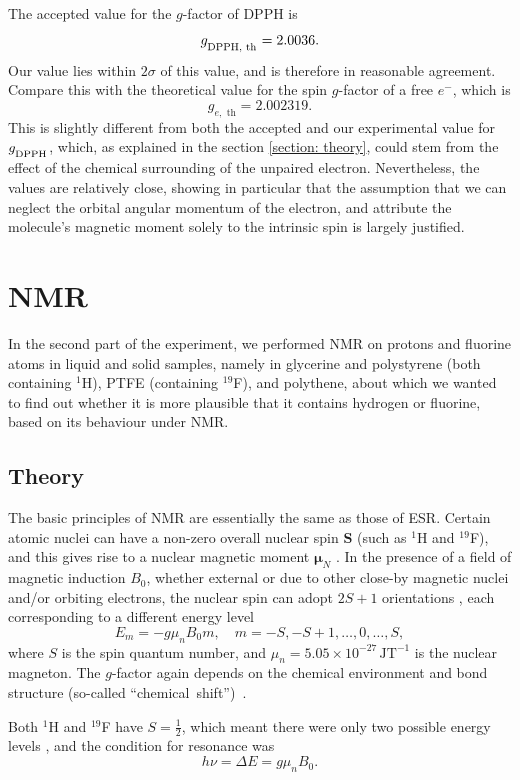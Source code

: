 \documentclass[a4paper]{jpconf}
\numberwithin{equation}{section}
\begin{document}
The accepted value for the $g$-factor of DPPH is
\[
	g_{\textsubscript{DPPH, th}} = 2.0036.
\]
Our value lies within $2\sigma$ of this value, and is therefore in reasonable agreement.
Compare this with the theoretical value for the spin $g$-factor of a free $e^-$, which is
\[
	g_{e,\text{ th}} = 2.002319.
\]
This is slightly different from both the accepted and our experimental value for $g_{\textsubscript{DPPH}}$, which, as explained in the section \ref{section: theory}, could stem from the effect of the chemical surrounding of the unpaired electron. Nevertheless, the values are relatively close, showing in particular that the assumption that we can neglect the orbital angular momentum of the electron, and attribute the molecule's magnetic moment solely to the intrinsic spin is largely justified.


\section{NMR} 
In the second part of the experiment, we performed NMR on protons and fluorine atoms in liquid and solid samples, namely in glycerine and polystyrene (both containing ${}^1$H), PTFE (containing ${}^{19}$F), and polythene, about which we wanted to find out whether it is more plausible that it contains hydrogen or fluorine, based on its behaviour under NMR.
\subsection{Theory}

The basic principles of NMR are essentially the same as those of ESR. Certain atomic nuclei can have a non-zero overall nuclear spin $\mathbf{S}$ (such as ${}^1$H and ${}^{19}$F), and this gives rise to a nuclear magnetic moment $\bm{\mu}_N$ \cite{Smith, Gero}. In the presence of a field of magnetic induction $B_0$, whether external or due to other close-by magnetic nuclei and/or orbiting electrons, the nuclear spin can adopt $2S + 1$ orientations \cite{Gero, Ball}, each corresponding to a different energy level
\[
	E_m = -g \mu_n B_0 m, \quad m = -S, -S+1, \dots, 0, \dots, S, 
\] 
where $S$ is the spin quantum number, and $\mu_n = 5.05 \times 10^{-27} \, \si{\joule\tesla\tothe{-1}}$ is the nuclear magneton.
The $g$-factor again depends on the chemical environment and bond structure (so-called ``chemical~shift'')~\cite{Ball}. 

Both ${}^1$H and ${}^{19}$F have $S = \tfrac{1}{2}$, which meant there were only two possible energy levels \cite{MacLaren, Gero}, and the condition for resonance was 
\begin{equation}\label{eqn: NMR resonance condition}
	h\nu = \Delta E = g \mu_n B_0.
\end{equation}
\end{document}
